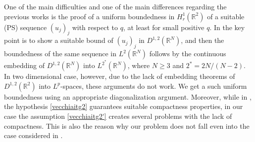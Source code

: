 \documentclass[11pt,leqno,twoside,reqno]{amsart}
\numberwithin{equation}{section}
\begin{document}
One of the main difficulties and one of the main differences regarding the previous works is the proof of a uniform boundedness in ${H^1_r({{\mathbb{R}^2}})}$ 
of a suitable (PS) sequence $(u_j)_j$ with respect to $q$, at least for small positive $q$. In \cite{ADP2} the key point is to show a 
suitable bound of $(u_j)_j$ in $D^{1,2}({{\mathbb{R}^N}})$, and then the boundedness of the same sequence in $L^2({{\mathbb{R}^N}})$ follows by the continuous embedding 
of $D^{1,2}({{\mathbb{R}^N}})$ into $L^{2^*}({{\mathbb{R}^N}})$, where $N{\geqslant} 3$ and $2^*=2N/(N-2)$. In two dimensional case,  however, due to the lack of embedding theorems 
of $D^{1,2}({{\mathbb{R}^2}})$ into $L^p$-spaces, these arguments do not work. We get a such uniform boundedness using an appropriate diagonalization argument.
Moreover, while in \cite{ADP2},  the hypothesis  \eqref{vecchiaitg2} guarantees suitable compactness properties, in our case the assumption 
\eqref{vecchiaitg2'} creates several problems with the lack of compactness. This is also the reason why our problem does not fall even into the case 
considered in \cite{JS}.
\end{document}

